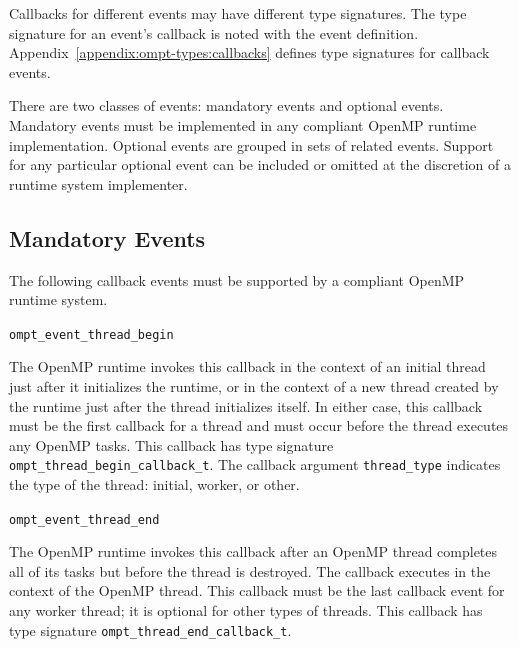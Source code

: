 \documentclass{article}
\newcommand{\descheader}[1]{{\needspace{3\baselineskip}\vspace{1em}\noindent \fbox{#1}}}
\begin{document}
Callbacks for different events may have different type signatures. 
The type signature for an event's callback is noted with the event definition.  Appendix~\ref{appendix:ompt-types:callbacks} defines type signatures for callback events.


There are two classes of events: mandatory events and optional events.
Mandatory events must be implemented in any compliant OpenMP runtime implementation. 
Optional events are grouped in sets of related events. Support for any particular optional event can be included or omitted at the 
discretion of a runtime system implementer. 




\subsection{Mandatory Events}
\label{sec:mandatory-events}

 The following callback events must be supported by a compliant OpenMP 
 runtime system. 

\descheader{Threads}

\begin{description}

\item \lstinline|ompt_event_thread_begin|

The OpenMP runtime invokes this callback in the context of an initial thread just after it initializes the runtime, or in the context of a new thread created by the runtime just after the thread initializes itself. In either case, this callback must be the first callback for a thread
and must occur before the thread executes any OpenMP tasks. This callback has type signature \lstinline|ompt_thread_begin_callback_t|. 
The callback argument \lstinline|thread_type| indicates the type of the thread: initial, worker, or other.


\item \lstinline|ompt_event_thread_end|

The OpenMP runtime invokes this callback
after an OpenMP thread completes all of
its tasks but before the thread is destroyed. The callback
executes in the context of the OpenMP thread. This callback must be the last callback event for any worker thread; it is optional for other types of threads.
This callback has type signature \lstinline|ompt_thread_end_callback_t|. 

\end{description}

\descheader{Parallel Regions}
\end{document}
